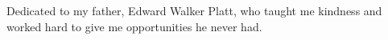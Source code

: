 Dedicated to my father, Edward Walker Platt,
who taught me kindness
and worked hard to give me opportunities he never had.
